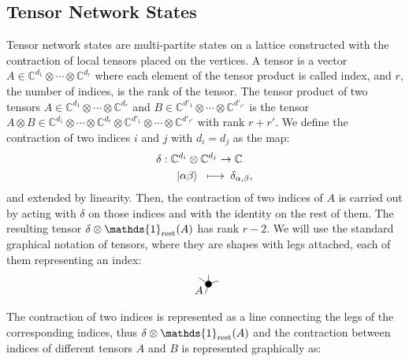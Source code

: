 \documentclass[smallextended]{svjour3}
\renewcommand{\1}{\mathbbm{1}}
\newcommand{\id}{\mathds{1}}
\newcommand{\ket} [1] {\vert #1 \rangle}
\begin{document}
\subsection{Tensor Network States}\label{sec:TNS}
Tensor network states are multi-partite states on a lattice constructed with the contraction of local tensors placed on the vertices. A tensor is a vector $A\in \mathbb{C}^{d_1}\otimes \cdots \otimes\mathbb{C}^{d_r}$ where each element of the tensor product is called index, and $r$, the number of indices, is the rank of the tensor. The tensor product of two tensors $A\in \mathbb{C}^{d_1}\otimes \cdots \otimes\mathbb{C}^{d_r}$ and $B\in \mathbb{C}^{d'_1}\otimes \cdots \otimes\mathbb{C}^{d'_{r'}}$ is the tensor $A\otimes B\in\mathbb{C}^{d_1}\otimes \cdots \otimes\mathbb{C}^{d_r}\otimes \mathbb{C}^{d'_1}\otimes \cdots \otimes\mathbb{C}^{d'_{r'}}$ with rank $r+r'$. We define the contraction of two indices $i$ and $j$ with $d_i=d_j$ as the map:
\begin{align*}
    \delta: \; & \mathbb{C}^{d_i}\otimes \mathbb{C}^{d_j} \to \mathbb{C}  \notag           \\
               & \;\; \ket{\alpha \beta} \;\; \longmapsto \;\delta_{\alpha,\beta}  \notag,
\end{align*}
and extended by linearity. Then, the contraction of two indices of $A$ is carried out by acting with $\delta$ on those indices and with the identity on the rest of them. The resulting tensor $\delta\otimes \id_{\rm rest} (A)$ has rank $r-2$. We will use the standard graphical notation of tensors, where they are shapes with legs attached,  each of them representing an index:
\begin{equation*}
    \begin{tikzpicture}
        \filldraw (0,0) circle (0.1);
        \draw (0,0)--(-0.1,-0.3);
        \draw (0,0)--(0,0.3);
        \draw (0,0)--(-0.3,0.2);
        \draw (0,0)--(0.3,0.1);
        \node at (-0.3,-0.2) {$A$};
    \end{tikzpicture}
\end{equation*}
The contraction of two indices is represented as a line connecting the legs of the corresponding indices, thus $\delta\otimes \id_{\rm rest} (A)$ and the contraction between indices of different tensors $A$ and $B$ is  represented graphically as:
\end{document}
